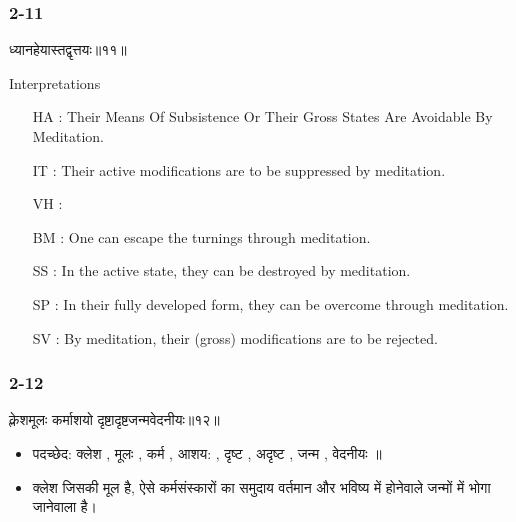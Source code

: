 \begin{frame}[fragile]\frametitle{2-11}
\begin{sanskrit}
ध्यानहेयास्तद्वृत्तयः॥११॥
\end{sanskrit}

Interpretations
\begin{itemize}
\item [HA]: Their Means Of Subsistence Or Their Gross States Are Avoidable By Meditation.
\item [IT]: Their active modifications are to be suppressed by meditation.
\item [VH]: 
\item [BM]: One can escape the turnings through meditation.
\item [SS]: In the active state, they can be destroyed by meditation.
\item [SP]: In their fully developed form, they can be overcome through meditation.
\item [SV]: By meditation, their (gross) modifications are to be rejected. 
\end{itemize}
	
\end{frame}

\begin{frame}[fragile]\frametitle{2-12}
\begin{sanskrit}
क्लेशमूलः कर्माशयो दृष्टादृष्टजन्मवेदनीयः॥१२॥
\end{sanskrit}

\begin{itemize}
\item पदच्छेद: क्लेश , मूलः , कर्म , आशय: , दृष्ट , अदृष्ट , जन्म , वेदनीयः ॥
\item क्लेश जिसकी मूल है, ऐसे कर्मसंस्कारों का समुदाय वर्तमान और भविष्य में होनेवाले जन्मों में भोगा जानेवाला है।
\end{itemize}
	
\end{frame}

